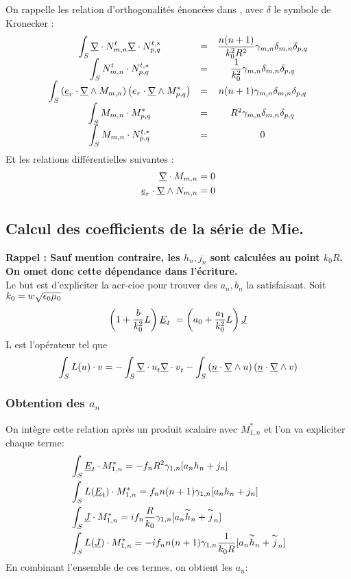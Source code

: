 On rappelle les relation d'orthogonalités énoncées dans \cite{marceaux_high-order_2000}, avec $\delta$ le symbole de Kronecker :
\[
  \begin{matrix}
    \displaystyle\int_S \underline{\nabla} \cdot N_{m,n}^t \underline{\nabla} \cdot N_{p,q}^{t,*} &=& \dfrac{n(n+1)}{k_0^2 R^2} \gamma_{m,n} \delta_{m,n} \delta_{p,q}\\
    \displaystyle\int_S N_{m,n}^t \cdot N_{p,q}^{t,*} &=& \dfrac{1}{k_0^2}\gamma_{m,n}\delta_{m,n} \delta_{p,q}\\
    \displaystyle\int_S \left(\underline{e}_r \cdot \underline{\nabla} \wedge M_{m,n}\right)\left( e_r \cdot \underline{\nabla} \wedge  M_{p,q}^{*}\right) &=& n(n+1) \gamma_{m,n} \delta_{m,n} \delta_{p,q}\\
    \displaystyle\int_S M_{m,n} \cdot M_{p,q}^{*} &=& R^2 \gamma_{m,n} \delta_{m,n} \delta_{p,q}\\
    \displaystyle\int_S M_{m,n} \cdot N_{p,q}^{t,*} &=& 0
  \end{matrix}
\]
Et les relations différentielles suivantes \cite{marceaux_etude_1997}:
\begin{align*}
  \underline{\nabla} \cdot M_{m,n} &=0 \\
  \underline{e}_r \cdot \underline{\nabla} \wedge N_{m,n} &= 0
\end{align*}

\subsection{Calcul des coefficients de la série de Mie.}
\textbf{Rappel : Sauf mention contraire, les $h_n,j_n$ sont calculées au point $k_0R$. On omet donc cette dépendance dans l'écriture.}\\
Le but est d'expliciter la \gls{acr-cioe} pour trouver des $a_n, b_n$ la satisfaisant.
Soit $k_0 = w\sqrt{\epsilon_0\mu_0}$
\begin{equation}
  \label{eq:CIOE} \left(1+\dfrac{b}{k_0^2}L\right)\underline{E}_t\ = \left(a_0 + \dfrac{a_1}{k_0^2}L\right)\underline{J}
\end{equation}
L est l'opérateur tel que 
\[
  \int_{S} L(u)\cdot v = - \int_{S} {\underline{\nabla} \cdot u}_t {\underline{\nabla} \cdot v}_t - \int_{S}\left(\underline{n} \cdot \underline{\nabla} \wedge u\right)\left( \underline{n} \cdot \underline{\nabla} \wedge v\right)
\]
\subsubsection{Obtention des $a_n$}
On intègre cette relation après un produit scalaire avec $M_{1,n}^{*}$ et l'on va expliciter chaque terme:
\begin{align*}
  &\int_S \underline{E}_t\cdot M_{1,n}^{*} = - f_n R^2 \gamma_{1,n}[a_n h_n + j_n]\\
  &\int_S L(\underline{E}_t)\cdot M_{1,n}^{*} =  f_n n(n+1)\gamma_{1,n}[a_n h_n + j_n]\\
  &\int_S \underline{J} \cdot M_{1,n}^{*} =  i f_n \dfrac{R}{k_0} \gamma_{1,n}[a_n \overset{\thicksim}{h}_n + \overset{\thicksim}{j}_n]\\
  &\int_S L(\underline{J}) \cdot M_{1,n}^{*} =  - i f_n n(n+1) \gamma_{1,n}\dfrac{1}{k_0 R}[a_n \overset{\thicksim}{h}_n + \overset{\thicksim}{j}_n]\\
\end{align*}
En combinant l'ensemble de ces termes, on obtient les $a_n$:


